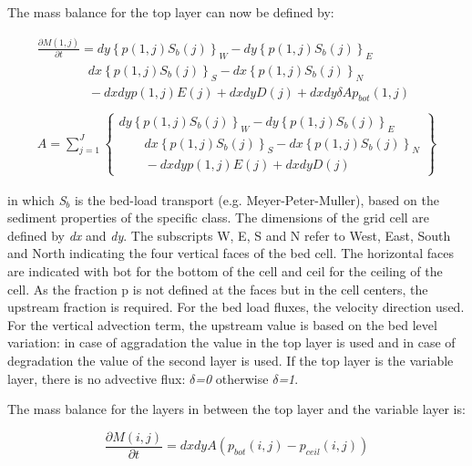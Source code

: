 \documentclass{article}
\begin{document}
\noindent 

\noindent The mass balance for the top layer can now be defined by:

\noindent 
\begin{equation} \label{6.21)} 
\begin{array}{l} {\frac{\partial M(1,j)}{\partial t} =dy\left\{p(1,j)S_{b} (j)\right\}_{W} -dy\left\{p(1,j)S_{b} (j)\right\}_{E} } \\ {\quad \quad \quad \quad dx\left\{p(1,j)S_{b} (j)\right\}_{S} -dx\left\{p(1,j)S_{b} (j)\right\}_{N} } \\ {\quad \quad \quad \quad -dxdyp(1,j)E(j)+dxdyD(j)+dxdy\delta Ap_{bot} (1,j)} \\ {} \\ {A=\sum _{j=1}^{J}\left\{\begin{array}{l} {dy\left\{p(1,j)S_{b} (j)\right\}_{W} -dy\left\{p(1,j)S_{b} (j)\right\}_{E} } \\ {\quad \quad dx\left\{p(1,j)S_{b} (j)\right\}_{S} -dx\left\{p(1,j)S_{b} (j)\right\}_{N} } \\ {\quad \quad -dxdyp(1,j)E(j)+dxdyD(j)} \end{array}\right\} } \end{array} 
\end{equation} 
 

\noindent in which \textit{S${}_{b}$} is the bed-load transport (e.g. Meyer-Peter-Muller), based on the sediment properties of the specific class. The dimensions of the grid cell are defined by \textit{dx} and \textit{dy}. The subscripts W, E, S and N refer to West, East, South and North indicating the four vertical faces of the bed cell. The horizontal faces are indicated with bot for the bottom of the cell and ceil for the ceiling of the cell.  As the fraction p is not defined at the faces but in the cell centers, the upstream fraction is required. For the bed load fluxes, the velocity direction used. For the vertical advection term, the upstream value is based on the bed level variation: in case of aggradation the value in the top layer is used and in case of degradation the value of the second layer is used. If the top layer is the variable layer, there is no advective flux: \textit{$\delta $=0} otherwise \textit{$\delta $=1}.

\noindent 

\noindent The mass balance for the layers in between the top layer and the variable layer is:

\noindent 
\begin{equation} \label{6.22)} 
\frac{\partial M(i,j)}{\partial t} =dxdyA\left(p_{bot} (i,j)-p_{ceil} (i,j)\right) 
\end{equation} 
 
\end{document}
